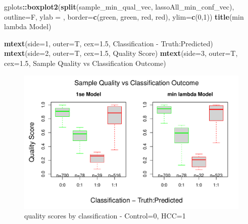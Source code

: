 \documentclass[
]{book}
\newenvironment{Shaded}{\begin{snugshade}}{\end{snugshade}}
\newcommand{\DataTypeTok}[1]{\textcolor[rgb]{0.13,0.29,0.53}{#1}}
\newcommand{\DecValTok}[1]{\textcolor[rgb]{0.00,0.00,0.81}{#1}}
\newcommand{\FloatTok}[1]{\textcolor[rgb]{0.00,0.00,0.81}{#1}}
\newcommand{\KeywordTok}[1]{\textcolor[rgb]{0.13,0.29,0.53}{\textbf{#1}}}
\newcommand{\NormalTok}[1]{#1}
\newcommand{\OperatorTok}[1]{\textcolor[rgb]{0.81,0.36,0.00}{\textbf{#1}}}
\newcommand{\StringTok}[1]{\textcolor[rgb]{0.31,0.60,0.02}{#1}}
\begin{document}
\begin{Shaded}
\begin{Highlighting}[]
\NormalTok{gplots}\OperatorTok{::}\KeywordTok{boxplot2}\NormalTok{(}\KeywordTok{split}\NormalTok{(sample\_min\_qual\_vec, lassoAll\_min\_conf\_vec), }
  \DataTypeTok{outline=}\NormalTok{F, }\DataTypeTok{ylab =} \StringTok{\textquotesingle{}\textquotesingle{}}\NormalTok{,}
  \DataTypeTok{border=}\KeywordTok{c}\NormalTok{(}\StringTok{\textquotesingle{}green\textquotesingle{}}\NormalTok{, }\StringTok{\textquotesingle{}green\textquotesingle{}}\NormalTok{, }\StringTok{\textquotesingle{}red\textquotesingle{}}\NormalTok{, }\StringTok{\textquotesingle{}red\textquotesingle{}}\NormalTok{),}
  \DataTypeTok{ylim=}\KeywordTok{c}\NormalTok{(}\DecValTok{0}\NormalTok{,}\DecValTok{1}\NormalTok{))}
\KeywordTok{title}\NormalTok{(}\StringTok{\textquotesingle{}min lambda Model\textquotesingle{}}\NormalTok{)}


\KeywordTok{mtext}\NormalTok{(}\DataTypeTok{side=}\DecValTok{1}\NormalTok{, }\DataTypeTok{outer=}\NormalTok{T, }\DataTypeTok{cex=}\FloatTok{1.5}\NormalTok{, }\StringTok{\textquotesingle{}Classification {-} Truth:Predicted\textquotesingle{}}\NormalTok{)}
\KeywordTok{mtext}\NormalTok{(}\DataTypeTok{side=}\DecValTok{2}\NormalTok{, }\DataTypeTok{outer=}\NormalTok{T, }\DataTypeTok{cex=}\FloatTok{1.5}\NormalTok{, }\StringTok{\textquotesingle{}Quality Score\textquotesingle{}}\NormalTok{)}
\KeywordTok{mtext}\NormalTok{(}\DataTypeTok{side=}\DecValTok{3}\NormalTok{, }\DataTypeTok{outer=}\NormalTok{T, }\DataTypeTok{cex=}\FloatTok{1.5}\NormalTok{, }\StringTok{\textquotesingle{}Sample Quality vs Classification Outcome\textquotesingle{}}\NormalTok{)}
\end{Highlighting}
\end{Shaded}

\begin{figure}
\centering
\includegraphics{Static/figures/plot-qual-conf-1.pdf}
\caption{\label{fig:plot-qual-conf}quality scores by classification - Control=0, HCC=1}
\end{figure}
\end{document}
